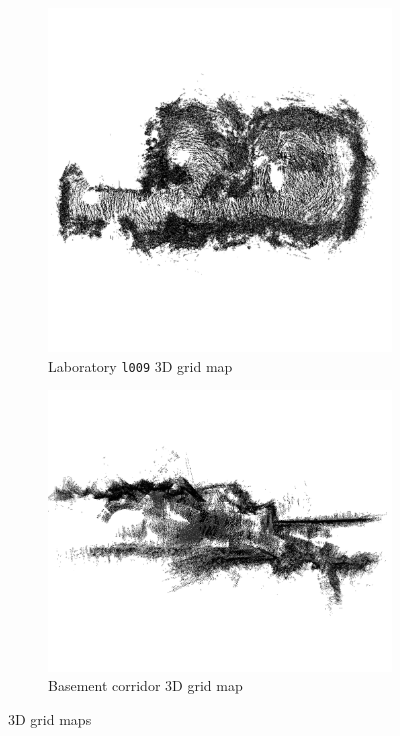 \begin{figure}[H]
  \centering
  \begin{subfigure}[b]{0.45\textwidth}
    \centering
    \includegraphics[width=\textwidth]{imgs/3dgridlab.png}
    \caption{Laboratory \texttt{l009} 3D grid map}
    \label{fig:results_3dlabg}
  \end{subfigure}
  \begin{subfigure}[b]{0.45\textwidth}
    \centering
    \includegraphics[width=\textwidth]{imgs/3d grid.png}
    \caption{Basement corridor 3D grid map}
    \label{fig:3dgridcorri}
  \end{subfigure}
  \caption{3D grid maps}
  \label{fig:3dgridresaults}
\end{figure}
